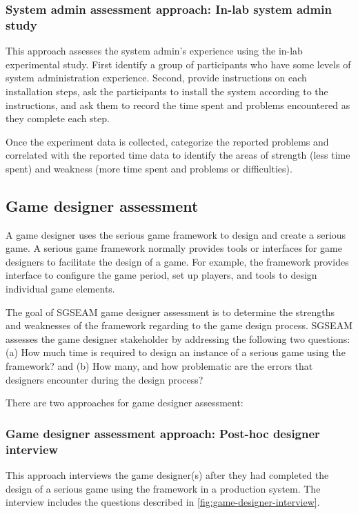 \documentclass[11pt,oneside]{book}
\begin{document}
\subsubsection{System admin assessment approach: In-lab system admin study}
\label{In-lab system admin study}

This approach assesses the system admin's experience using the in-lab experimental study. First identify a group 
of participants who have some levels of system administration experience. Second, provide instructions on 
each installation steps, ask the participants to install the system according to the instructions, and ask them to record 
the time spent and problems encountered as they complete each step.

Once the experiment data is collected, categorize the reported problems and correlated with the reported time data 
to identify the areas of strength (less time spent) and weakness (more time spent and problems or difficulties). 

\subsection{Game designer assessment}

A game designer uses the serious game framework to design and create a serious game.
A serious game framework normally provides tools or interfaces for game designers
to facilitate the design of a game. For example, the framework provides interface to configure the game period, set up 
players, and tools to design individual game elements.

The goal of SGSEAM game designer assessment is to determine the strengths and weaknesses of the framework 
regarding to the game design process. SGSEAM assesses the game designer stakeholder by addressing the following 
two questions: (a) How much time is required to design an instance of a serious game using the framework? and (b) How
many, and how problematic are the errors that designers encounter during the design process?

There are two approaches for game designer assessment:

\subsubsection{Game designer assessment approach: Post-hoc designer interview}
\label{Post-hoc game designer interview}

This approach interviews the game designer(s) after they had completed the design of a serious game using the 
framework in a production system. The interview includes the questions described in \autoref{fig:game-designer-interview}.
 
\end{document}

